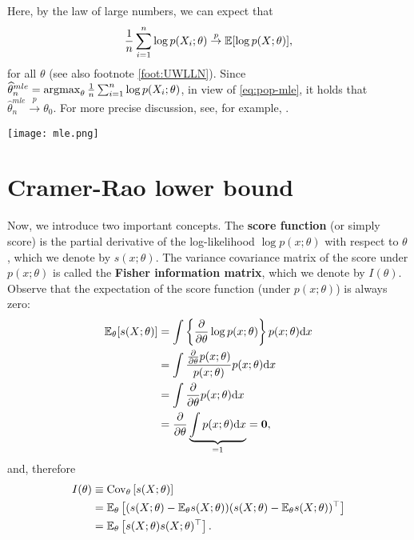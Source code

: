 \documentclass[11pt, A4paper, openany, uplatex]{book}
\begin{document}
Here, by the law of large numbers, we can expect that
\[
	\frac{1}{n}\sum_{i=1}^n \log p(X_i; \theta) \overset{p}{\to}  \mathbb{E}[\log p(X; \theta) ],
\]
for all $\theta$ (see also footnote \ref{foot:UWLLN}).
Since $\widehat{\theta}_n^{mle} = \operatorname*{\arg\!\max}_{\theta}\frac{1}{n}\sum_{i=1}^n \log p(X_i; \theta)$, in view of \eqref{eq:pop-mle}, it holds that  $\hat{\theta}_n^{mle} \overset{p}{\to} \theta_0$.
For more precise discussion, see, for example, \cite{newey1994large}.
\begin{center}
	\texttt{[image: mle.png]}
\end{center}

\section{Cramer-Rao lower bound}\label{sec:CRLB}
Now, we introduce two important concepts.
The \textbf{score function} (or simply score) is the partial derivative of the log-likelihood $\log p(x; \theta)$ with respect to $\theta$, which we denote by $s(x; \theta)$.
The variance covariance matrix of the score under $p(x; \theta)$ is called the \textbf{Fisher information matrix}, which we denote by $I(\theta)$.
Observe that the expectation of the score function (under $p(x; \theta)$) is always zero:
\begin{align}\label{eq:scorezero}
\begin{split}
	\mathbb{E}_\theta[s(X; \theta)]
	& = \int \left\{\frac{\partial}{\partial \theta}\log p(x; \theta)\right\} p(x; \theta) \mathrm{d}x \\
	& =  \int \frac{\frac{\partial}{\partial \theta} p(x; \theta)}{p(x; \theta)}p(x; \theta) \mathrm{d}x \\
	& = \int \frac{\partial}{\partial \theta} p(x; \theta)  \mathrm{d}x \\
	& = \frac{\partial}{\partial \theta} \underbrace{\int p(x; \theta) \mathrm{d}x}_{=1} = \mathbf{0},
\end{split}
\end{align}
and, therefore
\begin{align*}
	I(\theta) 
	& \equiv \mathrm{Cov}_{\theta}\left[ s(X; \theta) \right] \\
	& = \mathbb{E}_\theta \left[ ( s(X; \theta) - \mathbb{E}_\theta s(X; \theta) ) ( s(X; \theta) - \mathbb{E}_\theta s(X; \theta) )^\top \right] \\
	& = \mathbb{E}_\theta\left[ s(X; \theta) s(X; \theta)^\top \right].
\end{align*}
\bigskip
\end{document}
